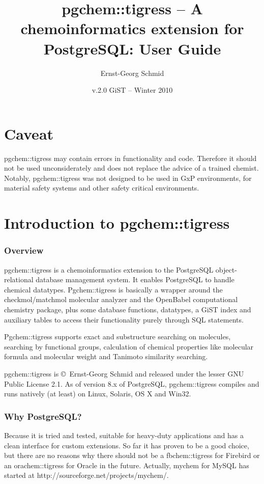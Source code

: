 \documentclass[a4paper]{article}
\begin{document}
\title{pgchem::tigress -- A chemoinformatics extension for PostgreSQL: User Guide}
\author{Ernst-Georg Schmid}
\date{v.2.0	GiST -- Winter 2010}
\maketitle%
\newpage
\tableofcontents\newpage
\part{Caveat}
pgchem::tigress may contain errors in functionality and code. Therefore it should not be used unconsiderately and does not replace the advice of a trained chemist.
Notably, pgchem::tigress was not designed to be used in GxP environments, for material safety systems and other safety critical environments.
\part{Introduction to pgchem::tigress}
\section{Overview}
pgchem::tigress is a chemoinformatics extension to the PostgreSQL object-relational database management system. It enables PostgreSQL to handle chemical datatypes. Pgchem::tigress is basically a wrapper around the checkmol/matchmol molecular analyzer and the OpenBabel computational chemistry package, plus some database functions, datatypes, a GiST index and auxiliary tables to access their functionality purely through SQL statements.\par
Pgchem::tigress supports exact and substructure searching on molecules, searching by functional groups, calculation of chemical properties like molecular formula and molecular weight and Tanimoto similarity searching.\par
pgchem::tigress is \copyright~Ernst-Georg Schmid and released under the lesser GNU Public License 2.1.
As of version 8.x of PostgreSQL, pgchem::tigress compiles and runs natively (at least) on Linux, Solaris, OS X and Win32. 
\section{Why PostgreSQL?}
Because it is tried and tested, suitable for heavy-duty applications and has a clean interface for custom extensions. So far it has proven to be a good choice, but there are no reasons why there should not be a fbchem::tigress for Firebird or an orachem::tigress for Oracle in the future. Actually, mychem for MySQL has started at http://sourceforge.net/projects/mychem/.
\end{document}
